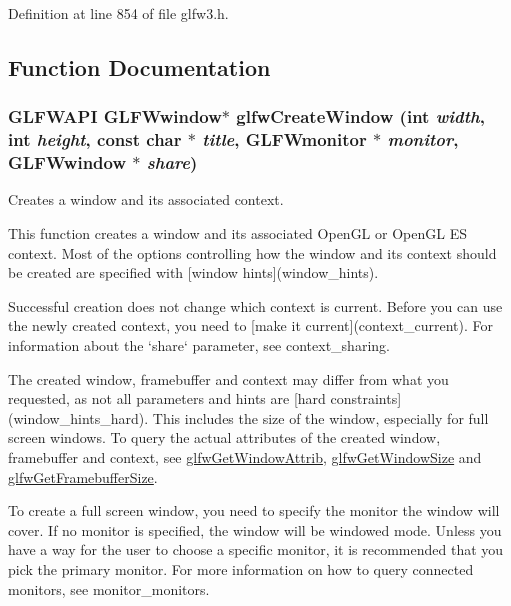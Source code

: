 Definition at line 854 of file glfw3.h.

\subsection{Function Documentation}
\hypertarget{group__window_g680a02abe0e4494b6759d5703240713e}{
\subsubsection[glfwCreateWindow]{\setlength{\rightskip}{0pt plus 5cm}GLFWAPI {\bf GLFWwindow}$\ast$ glfwCreateWindow (int {\em width}, \/  int {\em height}, \/  const char $\ast$ {\em title}, \/  {\bf GLFWmonitor} $\ast$ {\em monitor}, \/  {\bf GLFWwindow} $\ast$ {\em share})}}
\label{group__window_g680a02abe0e4494b6759d5703240713e}


Creates a window and its associated context. 

This function creates a window and its associated OpenGL or OpenGL ES context. Most of the options controlling how the window and its context should be created are specified with \mbox{[}window hints\mbox{]}(window\_\-hints).

Successful creation does not change which context is current. Before you can use the newly created context, you need to \mbox{[}make it current\mbox{]}(context\_\-current). For information about the `share` parameter, see context\_\-sharing.

The created window, framebuffer and context may differ from what you requested, as not all parameters and hints are \mbox{[}hard constraints\mbox{]}(window\_\-hints\_\-hard). This includes the size of the window, especially for full screen windows. To query the actual attributes of the created window, framebuffer and context, see \hyperlink{group__window_g1bb0c7e100418e284dbb800789c63d40}{glfwGetWindowAttrib}, \hyperlink{group__window_g7feb769ebb3f3d21579b5a3fb07be76e}{glfwGetWindowSize} and \hyperlink{group__window_gf7d17f3534b4b6dc9a6f905e3a240b7e}{glfwGetFramebufferSize}.

To create a full screen window, you need to specify the monitor the window will cover. If no monitor is specified, the window will be windowed mode. Unless you have a way for the user to choose a specific monitor, it is recommended that you pick the primary monitor. For more information on how to query connected monitors, see monitor\_\-monitors.

